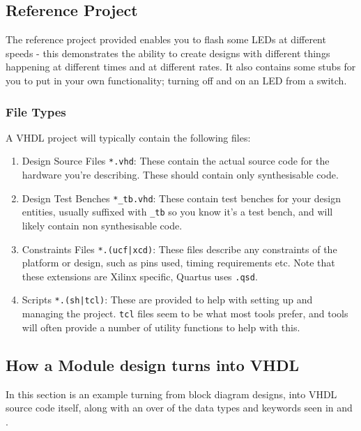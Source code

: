 \documentclass[11pt,a4paper]{article}
\begin{document}
\subsection{Reference Project}
The reference project provided enables you to flash some LEDs at different speeds - this demonstrates the ability to create designs with different things happening at different times and at different rates. It also contains some stubs for you to put in your own functionality; turning off and on an LED from a switch. 
\subsubsection{File Types}
A VHDL project will typically contain the following files:
\begin{enumerate}
    \item Design Source Files \texttt{*.vhd}: These contain the actual source code for the hardware you're describing. These should contain only synthesisable code.
    \item Design Test Benches \texttt{*\_tb.vhd}: These contain test benches for your design entities, usually suffixed with \texttt{\_tb} so you know it's a test bench, and will likely contain non synthesisable code.
    \item Constraints Files \texttt{*.(ucf|xcd)}: These files describe any constraints of the platform or design, such as pins used, timing requirements etc. Note that these extensions are Xilinx specific, Quartus uses \texttt{.qsd}.
    \item Scripts \texttt{*.(sh|tcl)}: These are provided to help with setting up and managing the project. \texttt{tcl} files seem to be what most tools prefer, and tools will often provide a number of utility functions to help with this. 
\end{enumerate}

\subsection{How a Module design turns into VHDL} 
In this section is an example turning from block diagram designs, into VHDL source code itself, along with an over of the data types and keywords seen in  and .
\end{document}
